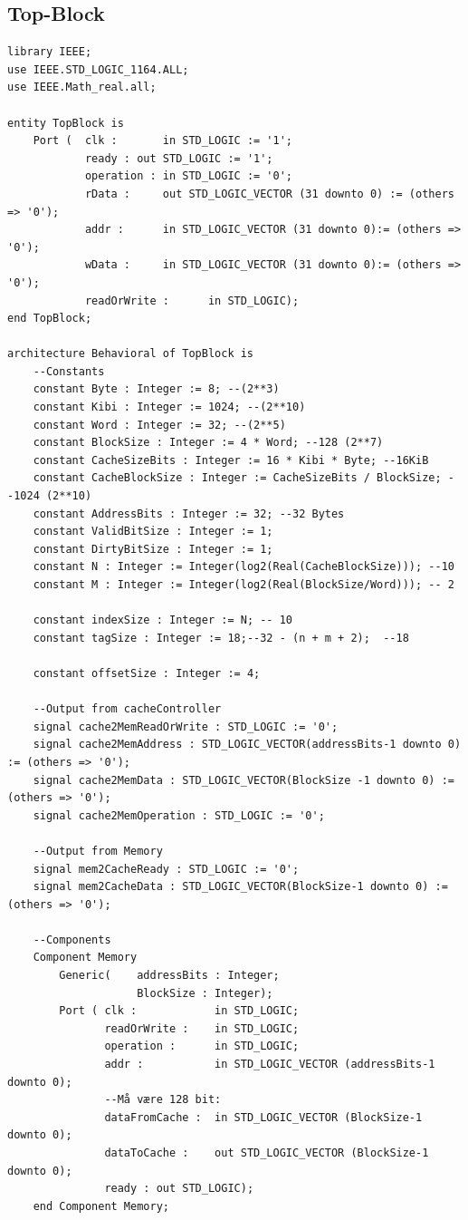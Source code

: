 \documentclass{article}
\begin{document}
\subsection{Top-Block}
\begin{lstlisting}
library IEEE;
use IEEE.STD_LOGIC_1164.ALL;
use IEEE.Math_real.all;

entity TopBlock is
    Port (  clk :       in STD_LOGIC := '1';
            ready : out STD_LOGIC := '1';
            operation : in STD_LOGIC := '0';
            rData :     out STD_LOGIC_VECTOR (31 downto 0) := (others => '0');
            addr :      in STD_LOGIC_VECTOR (31 downto 0):= (others => '0');
            wData :     in STD_LOGIC_VECTOR (31 downto 0):= (others => '0');
            readOrWrite :      in STD_LOGIC);
end TopBlock;

architecture Behavioral of TopBlock is
    --Constants
    constant Byte : Integer := 8; --(2**3)
    constant Kibi : Integer := 1024; --(2**10)
    constant Word : Integer := 32; --(2**5)
    constant BlockSize : Integer := 4 * Word; --128 (2**7)
    constant CacheSizeBits : Integer := 16 * Kibi * Byte; --16KiB
    constant CacheBlockSize : Integer := CacheSizeBits / BlockSize; --1024 (2**10)
    constant AddressBits : Integer := 32; --32 Bytes
    constant ValidBitSize : Integer := 1;
    constant DirtyBitSize : Integer := 1;
    constant N : Integer := Integer(log2(Real(CacheBlockSize))); --10
    constant M : Integer := Integer(log2(Real(BlockSize/Word))); -- 2

    constant indexSize : Integer := N; -- 10
    constant tagSize : Integer := 18;--32 - (n + m + 2);  --18

    constant offsetSize : Integer := 4;

    --Output from cacheController
    signal cache2MemReadOrWrite : STD_LOGIC := '0';
    signal cache2MemAddress : STD_LOGIC_VECTOR(addressBits-1 downto 0) := (others => '0');
    signal cache2MemData : STD_LOGIC_VECTOR(BlockSize -1 downto 0) := (others => '0');
    signal cache2MemOperation : STD_LOGIC := '0';

    --Output from Memory
    signal mem2CacheReady : STD_LOGIC := '0';
    signal mem2CacheData : STD_LOGIC_VECTOR(BlockSize-1 downto 0) := (others => '0');

    --Components
    Component Memory
        Generic(    addressBits : Integer;
                    BlockSize : Integer);
        Port ( clk :            in STD_LOGIC;
               readOrWrite :    in STD_LOGIC;
               operation :      in STD_LOGIC;
               addr :           in STD_LOGIC_VECTOR (addressBits-1 downto 0);
               --Må være 128 bit:
               dataFromCache :  in STD_LOGIC_VECTOR (BlockSize-1 downto 0);
               dataToCache :    out STD_LOGIC_VECTOR (BlockSize-1 downto 0);
               ready : out STD_LOGIC);
    end Component Memory;


\end{lstlisting}
\end{document}
